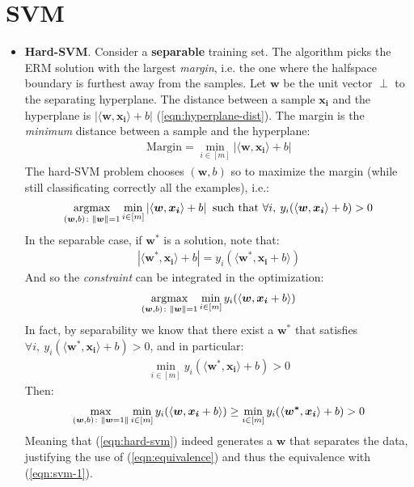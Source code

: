 \documentclass[../template.tex]{subfiles}
\begin{document}
\chapter{SVM}
\begin{itemize}
    \item \textbf{Hard-SVM}. Consider a \textbf{separable} training set. The algorithm picks the ERM solution with the largest \textit{margin}, i.e. the one where the halfspace boundary is furthest away from the samples. Let $\bm{w}$ be the unit vector $\perp$ to the separating hyperplane. The distance between a sample $\bm{x_i}$ and the hyperplane is $|\langle \bm{w}, \bm{x_i} \rangle + b|$ (\ref{eqn:hyperplane-dist}). The margin is the \textit{minimum} distance between a sample and the hyperplane:
    \begin{align*}
        \text{Margin} = \min_{i \in [m]} |\langle \bm{w}, \bm{x_i} \rangle + b|
    \end{align*} 
    The hard-SVM problem chooses $(\bm{w},b)$ so to maximize the margin (while still classificating correctly all the examples), i.e.:
    \begin{align} \label{eqn:svm-1}
        \underset{(\bm{w}, b)\colon \norm{\bm{w}} = 1}{\operatorname{argmax}} \min_{i \in [m]} |\langle \bm{w}, \bm{x_i} \rangle + b| \> \text{ such that } \forall i, \> y_i (\langle \bm{w}, \bm{x_i} \rangle + b) > 0
    \end{align}
    In the separable case, if $\bm{w^*}$ is a solution, note that:
    \begin{align} \label{eqn:equivalence}
        |\langle \bm{w^*}, \bm{x_i} \rangle + b| = y_i(\langle \bm{w^*}, \bm{x_i} + b\rangle)
    \end{align}
    And so the \textit{constraint} can be integrated in the optimization:
    \begin{align} \label{eqn:hard-svm}
        \underset{(\bm{w}, b)\colon \norm{\bm{w}} = 1}{\operatorname{argmax}} \min_{i \in [m]} y_i(\langle \bm{w}, \bm{x_i} + b\rangle)
    \end{align}
    In fact, by separability we know that there exist a $\bm{w^*}$ that satisfies $\forall i, \> y_i (\langle \bm{w^*}, \bm{x_i} \rangle + b) > 0$, and in particular:
    \begin{align*}
        \min_{i \in [m]} y_i (\langle \bm{w^*}, \bm{x_i} \rangle + b) > 0
    \end{align*}
    Then:
    \begin{align*}
        \max_{(\bm{w},b) \colon \norm{\bm{w}=1}} \min_{i \in [m]} y_i(\langle \bm{w}, \bm{x_i} + b\rangle) \geq  \min_{i \in [m]} y_i (\langle \bm{w^*}, \bm{x_i} \rangle + b) > 0
    \end{align*}
    Meaning that (\ref{eqn:hard-svm}) indeed generates a $\bm{w}$ that separates the data, justifying the use of (\ref{eqn:equivalence}) and thus the equivalence with (\ref{eqn:svm-1}).


\end{itemize}
\end{document}
